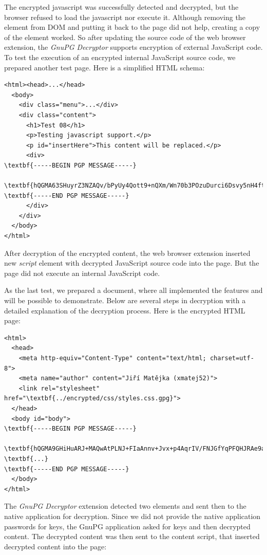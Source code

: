 The encrypted javascript was successfully detected and decrypted, but the browser refused to load the javascript nor execute it. Although removing the element from DOM and putting it back to the page did not help, creating a copy of the element worked. So after updating the source code of the web browser extension, the \textit{GnuPG Decryptor} supports encryption of external JavaScript code. To test the execution of an encrypted internal JavaScript source code, we prepared another test page. Here is a simplified HTML schema:

\begin{Verbatim}[commandchars=\\\{\},codes={\catcode`$=3\catcode`_=8},samepage=false,frame=single]
<html><head>...</head>
  <body>
    <div class="menu">...</div>
    <div class="content">
      <h1>Test 08</h1>
      <p>Testing javascript support.</p>
      <p id="insertHere">This content will be replaced.</p>
      <div>
\textbf{-----BEGIN PGP MESSAGE-----}

\textbf{hQGMA63SHuyrZ3NZAQv/bPyUy4Qott9+nQXm/Wn70b3POzuDurci6Dsvy5nH4ftN}
\textbf{-----END PGP MESSAGE-----}
      </div>
    </div>
  </body>
</html>
\end{Verbatim}

After decryption of the encrypted content, the web browser extension inserted new \textit{script} element with decrypted JavaScript source code into the page. But the page did not execute an internal JavaScript code.

As the last test, we prepared a document, where all implemented the features and will be possible to demonstrate. Below are several steps in decryption with a detailed explanation of the decryption process. Here is the encrypted HTML page:

\begin{Verbatim}[commandchars=\\\{\},codes={\catcode`$=3\catcode`_=8},samepage=false,frame=single]
<html>
  <head>
    <meta http-equiv="Content-Type" content="text/html; charset=utf-8">
    <meta name="author" content="Jiří Matějka (xmatej52)">
    <link rel="stylesheet" href="\textbf{../encrypted/css/styles.css.gpg}">
  </head>
  <body id="body">
\textbf{-----BEGIN PGP MESSAGE-----}

\textbf{hQGMA9GHiHuARJ+MAQwAtPLNJ+FIaAnnv+Jvx+p4AqrIV/FNJGfYqPFQHJRAe9a8}
\textbf{...}
\textbf{-----END PGP MESSAGE-----}
  </body>
</html>
\end{Verbatim}

The \textit{GnuPG Decryptor} extension detected two elements and sent then to the native application for decryption. Since we did not provide the native application passwords for keys, the GnuPG application asked for keys and then decrypted content. The decrypted content was then sent to the content script, that inserted decrypted content into the page:


